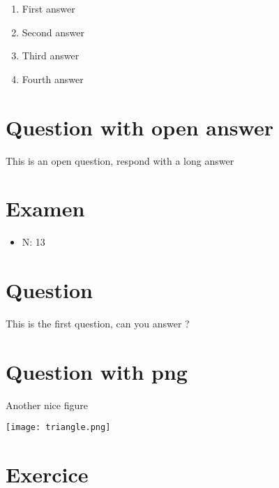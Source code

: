 \documentclass[a4paper,11pt,twoside]{article}
\begin{document}
\begin{enumerate}
\item First answer
\item Second answer
\item Third answer
\item Fourth answer
\end{enumerate}



\section*{Question with open answer}
\label{sec:orgccb9138}

This is an open question, respond with a long answer


\subsection*{}
\label{sec:orgeb3bb16}

\cleardoublepage

\section*{Examen}
\label{sec:orgd01e705}
\begin{itemize}
\item N: 13
\end{itemize}
\section*{Question}
\label{sec:org632cbe7}

This is the first question, can you answer ?



\section*{Question with png}
\label{sec:org0b8bfb9}

Another nice figure

\begin{center}
\texttt{[image: triangle.png]}
\end{center}



\section*{Exercice}
\label{sec:orgbca5298}
\end{document}
